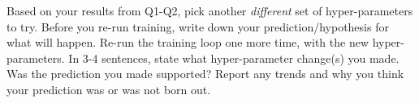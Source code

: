 \documentclass[11pt]{article}
\begin{document}
\vspace{2em}
 Based on your results from Q1-Q2, pick another \textit{different} set of hyper-parameters to try. Before you re-run training, write down your prediction/hypothesis for what will happen. Re-run the training loop one more time, with the new hyper-parameters. In 3-4 sentences, state what hyper-parameter change(s) you made. Was the prediction you made supported? Report any trends and why you think your prediction was or was not born out.
\end{document}
